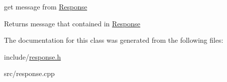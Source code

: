 get message from \hyperlink{classResponse}{Response} 

\begin{DoxyReturn}{Returns}
message that contained in \hyperlink{classResponse}{Response} 
\end{DoxyReturn}


The documentation for this class was generated from the following files\+:\begin{DoxyCompactItemize}
\item 
include/\hyperlink{response_8h}{response.\+h}\item 
src/response.\+cpp\end{DoxyCompactItemize}
